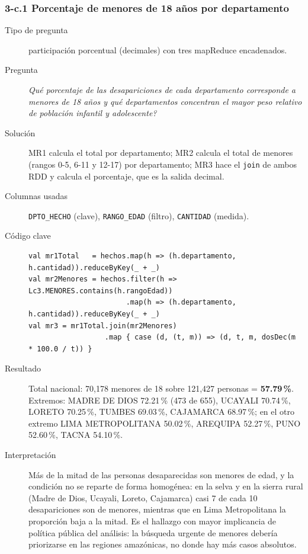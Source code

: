 \subsubsection*{3-c.1 \textbar{} Porcentaje de menores de 18 a\~nos por departamento}
\begin{description}
\item[Tipo de pregunta] participaci\'on porcentual (decimales) con tres mapReduce encadenados.
\item[Pregunta] \emph{Qu\'e porcentaje de las desapariciones de cada departamento corresponde a
      menores de 18 a\~nos y qu\'e departamentos concentran el mayor peso relativo de poblaci\'on
      infantil y adolescente?}
\item[Soluci\'on] MR1 calcula el total por departamento; MR2 calcula el total de menores
      (rangos 0-5, 6-11 y 12-17) por departamento; MR3 hace el \texttt{join} de ambos RDD y
      calcula el porcentaje, que es la salida decimal.
\item[Columnas usadas] \texttt{DPTO\_HECHO} (clave), \texttt{RANGO\_EDAD} (filtro),
      \texttt{CANTIDAD} (medida).
\item[C\'odigo clave]
\begin{lstlisting}[style=scala]
val mr1Total   = hechos.map(h => (h.departamento, h.cantidad)).reduceByKey(_ + _)
val mr2Menores = hechos.filter(h => Lc3.MENORES.contains(h.rangoEdad))
                       .map(h => (h.departamento, h.cantidad)).reduceByKey(_ + _)
val mr3 = mr1Total.join(mr2Menores)
                  .map { case (d, (t, m)) => (d, t, m, dosDec(m * 100.0 / t)) }
\end{lstlisting}
\item[Resultado] Total nacional: 70,178 menores de 18 sobre 121,427 personas =
      \textbf{57.79\,\%}. Extremos: MADRE DE DIOS 72.21\,\% (473 de 655), UCAYALI 70.74\,\%,
      LORETO 70.25\,\%, TUMBES 69.03\,\%, CAJAMARCA 68.97\,\%; en el otro extremo LIMA
      METROPOLITANA 50.02\,\%, AREQUIPA 52.27\,\%, PUNO 52.60\,\%, TACNA 54.10\,\%.
\item[Interpretaci\'on] M\'as de la mitad de las personas desaparecidas son menores de edad, y
      la condici\'on no se reparte de forma homog\'enea: en la selva y en la sierra rural
      (Madre de Dios, Ucayali, Loreto, Cajamarca) casi 7 de cada 10 desapariciones son de
      menores, mientras que en Lima Metropolitana la proporci\'on baja a la mitad. Es el
      hallazgo con mayor implicancia de pol\'itica p\'ublica del an\'alisis: la b\'usqueda
      urgente de menores deber\'ia priorizarse en las regiones amaz\'onicas, no donde hay m\'as
      casos absolutos.
\end{description}

